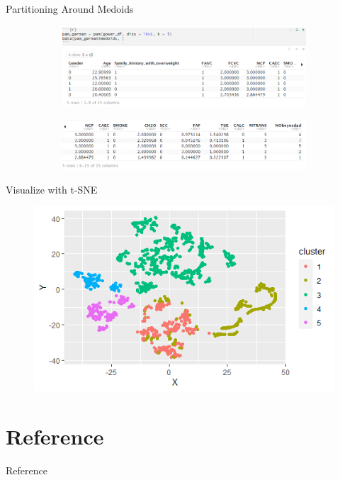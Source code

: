 \documentclass[11pt]{beamer}
\begin{document}
\begin{frame}{Partitioning Around Medoids}
\begin{figure}
\begin{subfigure}{\textwidth}
  \centering
  \includegraphics[width=.8\linewidth]{images/Picture4.png}
  
\end{subfigure}%
\begin{subfigure}{\textwidth}
  \centering
  \includegraphics[width=.8\linewidth]{images/Picture5.png}
\end{subfigure}
\end{figure}

\end{frame}

\begin{frame}{Visualize with t-SNE}
\begin{figure}
    \centering
    \includegraphics[width=1\linewidth]{images/visualization_pam.png}
    \label{fig:my_label}
\end{figure}

\end{frame}


\section{Reference}
\begin{frame}{Reference}
    
\end{frame}
\end{document}
